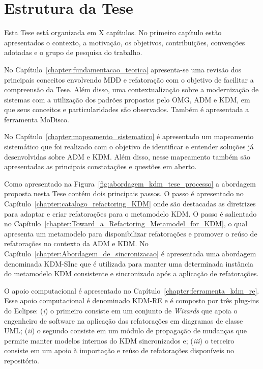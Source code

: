 \section{Estrutura da Tese}

Esta Tese está organizada em X capítulos. No primeiro capítulo estão apresentados o contexto, a motivação, os objetivos, contribuições, convenções adotadas e o grupo de pesquisa do trabalho. 

No Capítulo~\ref{chapter:fundamentacao_teorica} apresenta-se uma revisão dos principais conceitos envolvendo MDD e refatoração com o objetivo de facilitar a compreensão da Tese. Além disso, uma contextualização sobre a modernização de sistemas com a utilização dos padrões propostos pelo OMG, ADM e KDM, em que seus conceitos e particularidades são observados. Também é apresentada a ferramenta MoDisco.


No Capítulo~\ref{chapter:mapeamento_sistematico} é apresentado um mapeamento sistemático que foi realizado com o objetivo de identificar e entender soluções já desenvolvidas sobre ADM e KDM. Além disso, nesse mapeamento também são apresentadas as principais constatações e questões em aberto.

Como apresentado na Figura~\ref{fig:abordagem_kdm_tese_processo} a abordagem proposta nesta Tese contém dois principais passos. O passo  é apresentado no Capítulo~\ref{chapter:catalogo_refactoring_KDM} onde são destacadas as diretrizes para adaptar e criar refatorações para o metamodelo KDM. O passo  é salientado no Capítulo~\ref{chapter:Toward_a_Refactoring_Metamodel_for_KDM}, o qual apresenta um metamodelo para disponibilizar refatorações e promover o reúso de refatorações no contexto da ADM e KDM. No Capítulo~\ref{chapter:Abordagem_de_sincronizacao} é apresentada uma abordagem denominada KDM-SInc que é utilizada para manter uma determinada instância do metamodelo KDM consistente e sincronizado após a aplicação de refatorações. 

O apoio computacional  é apresentado no Capítulo~\ref{chapter:ferramenta_kdm_re}. Esse apoio computacional é denominado KDM-RE e é composto por três plug-ins do Eclipse: (\textit{i}) o primeiro consiste em um conjunto de \textit{Wizards} que apoia o engenheiro de software na aplicação das refatorações em diagramas de classe UML; (\textit{ii}) o segundo consiste em um módulo de propagação de mudanças que permite manter modelos internos do KDM sincronizados e; (\textit{iii}) o terceiro consiste em um apoio à importação e reúso de refatorações disponíveis no repositório.


